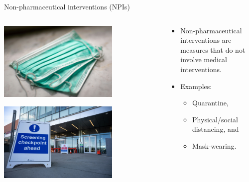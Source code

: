 \documentclass[
  ignorenonframetext,
]{beamer}
\providecommand{\tightlist}{%
  \setlength{\itemsep}{0pt}\setlength{\parskip}{0pt}}\usepackage{longtable,booktabs,array}
\begin{document}
\begin{frame}
\begin{block}{Non-pharmaceutical interventions (NPIs)}
\label{sec-npi}
\begin{columns}[T]
\begin{column}{0.5\textwidth}
\includegraphics[width=0.7\textwidth,height=\textheight]{images/mask.jpeg}

\includegraphics[width=0.7\textwidth,height=\textheight]{images/screening.jpeg}
\end{column}

\begin{column}{0.5\textwidth}
\begin{itemize}
\item
  Non-pharmaceutical interventions are measures that do not involve
  medical interventions.
\item
  Examples:

  \begin{itemize}
  \tightlist
  \item
    Quarantine,
  \item
    Physical/social distancing, and
  \item
    Mask-wearing.
  \end{itemize}
\end{itemize}
\end{column}
\end{columns}
\end{block}
\end{frame}
\end{document}
